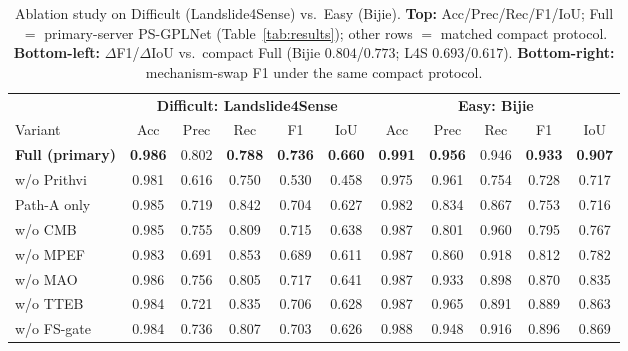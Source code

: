\documentclass[10pt,twocolumn,letterpaper]{article}
\begin{document}
\begin{table}[!t]
\centering
\caption{Ablation study on Difficult (Landslide4Sense) vs.\ Easy (Bijie).
\textbf{Top:} Acc/Prec/Rec/F1/IoU; Full $=$ primary-server PS-GPLNet (Table~\ref{tab:results}); other rows $=$ matched compact protocol.
\textbf{Bottom-left:} \(\Delta\)F1/\(\Delta\)IoU vs.\ compact Full (Bijie $0.804$/$0.773$; L4S $0.693$/$0.617$).
\textbf{Bottom-right:} mechanism-swap F1 under the same compact protocol.}
\label{tab:ablation-main}
\label{tab:ablation-delta}
\setlength{\tabcolsep}{3.8pt}
\footnotesize
\begin{tabular}{lccccc|ccccc}
\toprule
& \multicolumn{5}{c|}{\textbf{Difficult: Landslide4Sense}} & \multicolumn{5}{c}{\textbf{Easy: Bijie}} \\
\cmidrule(lr){2-6} \cmidrule(l){7-11}
Variant & Acc & Prec & Rec & F1 & IoU & Acc & Prec & Rec & F1 & IoU \\
\midrule
\textbf{Full (primary)} & \textbf{0.986} & 0.802 & \textbf{0.788} & \textbf{0.736} & \textbf{0.660} & \textbf{0.991} & \textbf{0.956} & 0.946 & \textbf{0.933} & \textbf{0.907} \\
\midrule
w/o Prithvi & 0.981 & 0.616 & 0.750 & 0.530 & 0.458 & 0.975 & 0.961 & 0.754 & 0.728 & 0.717 \\
Path-A only & 0.985 & 0.719 & 0.842 & 0.704 & 0.627 & 0.982 & 0.834 & 0.867 & 0.753 & 0.716 \\
w/o CMB & 0.985 & 0.755 & 0.809 & 0.715 & 0.638 & 0.987 & 0.801 & 0.960 & 0.795 & 0.767 \\
w/o MPEF & 0.983 & 0.691 & 0.853 & 0.689 & 0.611 & 0.987 & 0.860 & 0.918 & 0.812 & 0.782 \\
w/o MAO & 0.986 & 0.756 & 0.805 & 0.717 & 0.641 & 0.987 & 0.933 & 0.898 & 0.870 & 0.835 \\
w/o TTEB & 0.984 & 0.721 & 0.835 & 0.706 & 0.628 & 0.987 & 0.965 & 0.891 & 0.889 & 0.863 \\
w/o FS-gate & 0.984 & 0.736 & 0.807 & 0.703 & 0.626 & 0.988 & 0.948 & 0.916 & 0.896 & 0.869 \\
\bottomrule
\end{tabular}


\end{table}
\end{document}
